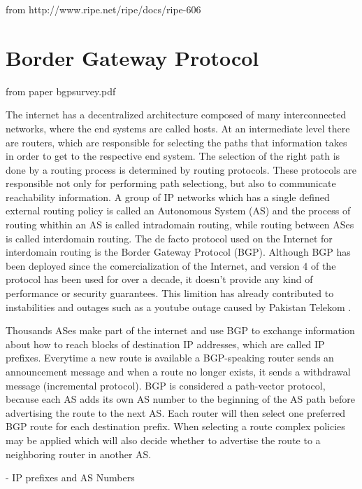 \documentclass[11pt,a4paper]{scrreprt}
\begin{document}
   
from http://www.ripe.net/ripe/docs/ripe-606

\section{Border Gateway Protocol}

from paper bgpsurvey.pdf

The internet has a decentralized architecture composed of many interconnected networks, where the end systems are called hosts. At an intermediate level there are routers, which are responsible for selecting the paths that information takes in order to get to the respective end system. The selection of the right path is done by a routing process is determined by routing protocols. These protocols are responsible not only for performing path selectiong, but also to communicate reachability information. A group of IP networks which has a single defined external routing policy is called an Autonomous System (AS) and the process of routing whithin an AS is called intradomain routing, while routing between ASes is called interdomain routing. The de facto protocol used on the Internet for interdomain routing is the Border Gateway Protocol (BGP).
Although BGP has been deployed since the comercialization of the Internet, and version 4 of the protocol has been used for over a decade, it doesn't provide any kind of performance or security guarantees. This limition has already contributed to instabilities and outages \cite{Misdirection} such as a youtube outage caused by Pakistan Telekom \cite{Pakistan}. 

	Thousands ASes make part of the internet and use BGP to exchange information about how to reach blocks of destination IP addresses, which are called IP prefixes. Everytime a new route is available a BGP-speaking router sends an announcement message and when a route no longer exists, it sends a withdrawal message (incremental protocol). BGP is considered a path-vector protocol, because each AS adds its own AS number to the beginning of the AS path before advertising the route to the next AS. Each router will then select one preferred BGP route for each destination prefix. When selecting a route complex policies may be applied which will also decide whether to advertise the route to a neighboring router in another AS.   

	- IP prefixes and AS Numbers
	
\end{document}
